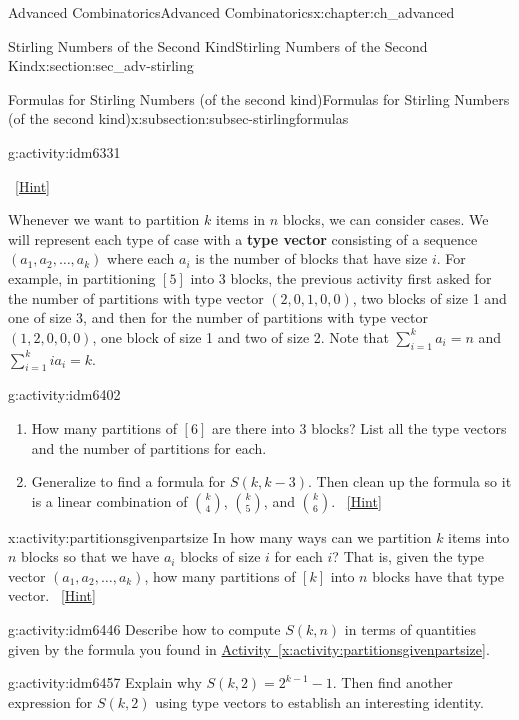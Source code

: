 \documentclass[oneside,10pt,]{book}
\newcommand{\terminology}[1]{\textbf{#1}}
\numberwithin{equation}{chapter}
\begin{document}
\begin{chapterptx}{Advanced Combinatorics}{}{Advanced Combinatorics}{}{}{x:chapter:ch_advanced}
\begin{sectionptx}{Stirling Numbers of the Second Kind}{}{Stirling Numbers of the Second Kind}{}{}{x:section:sec_adv-stirling}
\begin{subsectionptx}{Formulas for Stirling Numbers (of the second kind)}{}{Formulas for Stirling Numbers (of the second kind)}{}{}{x:subsection:subsec-stirlingformulas}
\begin{activity}{}{g:activity:idm6331}
\begin{enumerate}[font=\bfseries,label=(\alph*),ref=\alph*]
\qquad~\hfill{\tiny\hyperlink{g:hint:idm6377-back}{[Hint]}}\end{enumerate}
\end{activity}
 Whenever we want to partition \(k\) items in \(n\) blocks, we can consider cases.  We will represent each type of case with a \terminology{type vector} consisting of a sequence \((a_1, a_2, \ldots, a_k)\) where each \(a_i\) is the number of blocks that have size \(i\).  For example, in partitioning \([5]\) into 3 blocks, the previous activity first asked for the number of partitions with type vector \((2,0,1,0,0)\), two blocks of size 1 and one of size 3, and then for the number of partitions with type vector \((1,2,0,0,0)\), one block of size 1 and two of size 2.  Note that \(\sum_{i=1}^k a_i = n\) and \(\sum_{i=1}^k ia_i = k\).%
\begin{activity}{}{g:activity:idm6402}%
\begin{enumerate}[font=\bfseries,label=(\alph*),ref=\alph*]
\item{}How many partitions of \([6]\) are there into 3 blocks?  List all the type vectors and the number of partitions for each.%
\item{}Generalize to find a formula for \(S(k,k-3)\).  Then clean up the formula so it is a linear combination of \(\binom{k}{4}\), \(\binom{k}{5}\), and \(\binom{k}{6}\).%
\qquad~\hfill{\tiny\hyperlink{g:hint:idm6414-back}{[Hint]}}\end{enumerate}
\end{activity}
\begin{activity}{}{x:activity:partitionsgivenpartsize}%
In how many ways can we partition \(k\) items into \(n\) blocks so that we have \(a_i\) blocks of size \(i\) for each \(i\)? That is, given the type vector \((a_1, a_2, \ldots, a_k)\), how many partitions of \([k]\) into \(n\) blocks have that type vector.%
\qquad~\hfill{\tiny\hyperlink{g:hint:idm6428-back}{[Hint]}}\end{activity}
\begin{activity}{}{g:activity:idm6446}%
Describe how to compute \(S(k,n)\) in terms of quantities given by the formula you found in \hyperref[x:activity:partitionsgivenpartsize]{Activity~\ref{x:activity:partitionsgivenpartsize}}.%
\end{activity}
\begin{activity}{}{g:activity:idm6457}%
Explain why \(S(k, 2) = 2^{k-1} - 1\).  Then find another expression for \(S(k,2)\) using type vectors to establish an interesting identity.%

\end{activity}
\end{subsectionptx}
\end{sectionptx}
\end{chapterptx}
\end{document}
